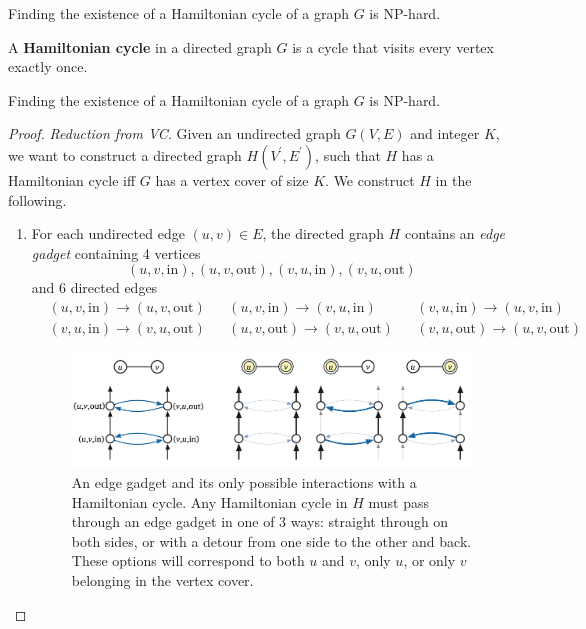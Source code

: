 \documentclass{article}
\begin{document}
      \begin{theorem}
        Finding the existence of a Hamiltonian cycle of a graph $G$ is NP-hard. 
      \end{theorem}

      \begin{definition}
        A \textbf{Hamiltonian cycle} in a directed graph $G$ is a cycle that visits every vertex exactly once. 
      \end{definition}

      \begin{theorem}
        Finding the existence of a Hamiltonian cycle of a graph $G$ is NP-hard. 
      \end{theorem}
      \begin{proof}
        \textit{Reduction from VC}. Given an undirected graph $G(V, E)$ and integer $K$, we want to construct a directed graph $H(V^\prime, E^\prime)$, such that $H$ has a Hamiltonian cycle iff $G$ has a vertex cover of size $K$. We construct $H$ in the following. 
        \begin{enumerate}
          \item For each undirected edge $(u, v) \in E$, the directed graph $H$ contains an \textit{edge gadget} containing 4 vertices 
            \begin{equation}
              (u, v, \mathrm{in}), (u, v, \mathrm{out}), (v, u, \mathrm{in}), (v, u, \mathrm{out})
            \end{equation}
            and 6 directed edges 
            \begin{align*}
              & (u, v, \mathrm{in}) \rightarrow (u, v, \mathrm{out}) & 
              & (u, v, \mathrm{in}) \rightarrow (v, u, \mathrm{in}) & 
              & (v, u, \mathrm{in}) \rightarrow (u, v, \mathrm{in}) \\
              & (v, u, \mathrm{in}) \rightarrow (v, u, \mathrm{out}) & 
              & (u, v, \mathrm{out}) \rightarrow (v, u, \mathrm{out}) & 
              & (v, u, \mathrm{out}) \rightarrow (u, v, \mathrm{out})
            \end{align*}

            \begin{figure}[H]
              \centering 
              \includegraphics[scale=0.4]{img/edge_gadget.png}
              \caption{An edge gadget and its only possible interactions with a Hamiltonian cycle. Any Hamiltonian cycle in $H$ must pass through an edge gadget in one of 3 ways: straight through on both sides, or with a detour from one side to the other and back. These options will correspond to both $u$ and $v$, only $u$, or only $v$ belonging in the vertex cover.} 
              \label{fig:edge_gadget}
            \end{figure}


\end{enumerate}
\end{proof}
\end{document}

